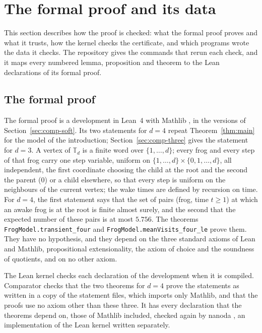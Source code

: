 \documentclass[11pt]{amsart}
\theoremstyle{definition}
\numberwithin{equation}{section}
\newcommand{\computed}[1]{\ignorespaces}
\newcommand{\T}{\mathbb{T}}
\begin{document}
\section{The formal proof and its data}\label{sec:comp}

This section describes how the proof is checked: what the formal proof proves and what it trusts, how the kernel checks the certificate, and which programs wrote the data it checks. The repository gives the commands that rerun each check, and it maps every numbered lemma, proposition and theorem to the Lean declarations of its formal proof.

\subsection{The formal proof}\label{sec:comp-lean}\computed{FrogModel/Challenge.lean, .github/workflows/ci.yml, code/formal-proof/main_axioms.lean}
The formal proof \cite{FrogLean} is a development in Lean~4 \cite{Lean4} with Mathlib \cite{Mathlib20}, in the versions of Section~\ref{sec:comp-soft}. Its two statements for $d=4$ repeat Theorem~\ref{thm:main} for the model of the introduction; Section~\ref{sec:comp-three} gives the statement for $d=3$. A vertex of $\T_d$ is a finite word over $\{1,\dots,d\}$; every frog and every step of that frog carry one step variable, uniform on $\{1,\dots,d\}\times\{0,1,\dots,d\}$, all independent, the first coordinate choosing the child at the root and the second the parent ($0$) or a child elsewhere, so that every step is uniform on the neighbours of the current vertex; the wake times are defined by recursion on time. For $d=4$, the first statement says that the set of pairs (frog, time $t\ge1$) at which an awake frog is at the root is finite almost surely, and the second that the expected number of these pairs is at most $5.756$. The theorems \texttt{FrogModel.transient\_four} and \texttt{FrogModel.meanVisits\_four\_le} prove them. They have no hypothesis, and they depend on the three standard axioms of Lean and Mathlib, propositional extensionality, the axiom of choice and the soundness of quotients, and on no other axiom.

The Lean kernel checks each declaration of the development when it is compiled. Comparator \cite{Comparator} checks that the two theorems for $d=4$ prove the statements as written in a copy of the statement files, which imports only Mathlib, and that the proofs use no axiom other than these three. It has every declaration that the theorems depend on, those of Mathlib included, checked again by nanoda \cite{nanoda}, an implementation of the Lean kernel written separately.
\end{document}
